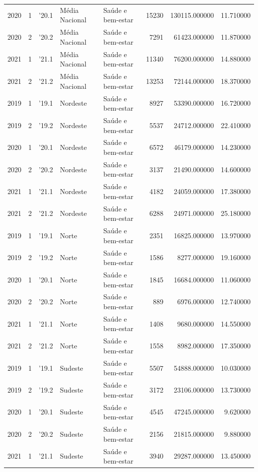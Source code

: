 \begin{longtable}{rrlllrrr}
2020 & 1 & '20.1 & Média Nacional & Saúde e bem-estar & 15230 & 130115.000000 & 11.710000 \\
2020 & 2 & '20.2 & Média Nacional & Saúde e bem-estar & 7291 & 61423.000000 & 11.870000 \\
2021 & 1 & '21.1 & Média Nacional & Saúde e bem-estar & 11340 & 76200.000000 & 14.880000 \\
2021 & 2 & '21.2 & Média Nacional & Saúde e bem-estar & 13253 & 72144.000000 & 18.370000 \\
2019 & 1 & '19.1 & Nordeste & Saúde e bem-estar & 8927 & 53390.000000 & 16.720000 \\
2019 & 2 & '19.2 & Nordeste & Saúde e bem-estar & 5537 & 24712.000000 & 22.410000 \\
2020 & 1 & '20.1 & Nordeste & Saúde e bem-estar & 6572 & 46179.000000 & 14.230000 \\
2020 & 2 & '20.2 & Nordeste & Saúde e bem-estar & 3137 & 21490.000000 & 14.600000 \\
2021 & 1 & '21.1 & Nordeste & Saúde e bem-estar & 4182 & 24059.000000 & 17.380000 \\
2021 & 2 & '21.2 & Nordeste & Saúde e bem-estar & 6288 & 24971.000000 & 25.180000 \\
2019 & 1 & '19.1 & Norte & Saúde e bem-estar & 2351 & 16825.000000 & 13.970000 \\
2019 & 2 & '19.2 & Norte & Saúde e bem-estar & 1586 & 8277.000000 & 19.160000 \\
2020 & 1 & '20.1 & Norte & Saúde e bem-estar & 1845 & 16684.000000 & 11.060000 \\
2020 & 2 & '20.2 & Norte & Saúde e bem-estar & 889 & 6976.000000 & 12.740000 \\
2021 & 1 & '21.1 & Norte & Saúde e bem-estar & 1408 & 9680.000000 & 14.550000 \\
2021 & 2 & '21.2 & Norte & Saúde e bem-estar & 1558 & 8982.000000 & 17.350000 \\
2019 & 1 & '19.1 & Sudeste & Saúde e bem-estar & 5507 & 54888.000000 & 10.030000 \\
2019 & 2 & '19.2 & Sudeste & Saúde e bem-estar & 3172 & 23106.000000 & 13.730000 \\
2020 & 1 & '20.1 & Sudeste & Saúde e bem-estar & 4545 & 47245.000000 & 9.620000 \\
2020 & 2 & '20.2 & Sudeste & Saúde e bem-estar & 2156 & 21815.000000 & 9.880000 \\
2021 & 1 & '21.1 & Sudeste & Saúde e bem-estar & 3940 & 29287.000000 & 13.450000 \\

\end{longtable}
